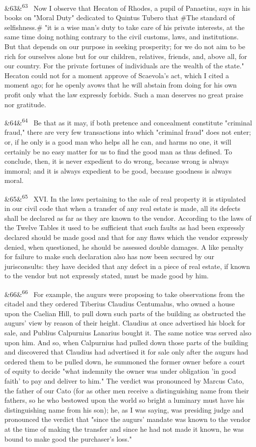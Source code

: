 \documentclass[12pt]{article}
\newcommand{\para}[1][]{\par\noindent\ifx&#1&\else\textsuperscript{\footnotesize #1}~\fi}
\begin{document}
\para[63] Now I observe that Hecaton of Rhodes, a pupil of Panaetius, says in his books on "Moral Duty" dedicated to Quintus Tubero that \#The standard of selfishness.\# "it is a wise man's duty to take care of his private interests, at the same time doing nothing contrary to the civil customs, laws, and institutions. But that depends on our purpose in seeking prosperity; for we do not aim to be rich for ourselves alone but for our children, relatives, friends, and, above all, for our country. For the private fortunes of individuals are the wealth of the state." Hecaton could not for a moment approve of Scaevola's act, which I cited a moment ago; for he openly avows that he will abstain from doing for his own profit only what the law expressly forbids. Such a man deserves no great praise nor gratitude.

\para[64] Be that as it may, if both pretence and concealment constitute "criminal fraud," there are very few transactions into which "criminal fraud" does not enter; or, if he only is a good man who helps all he can, and harms no one, it will certainly be no easy matter for us to find the good man as thus defined. To conclude, then, it is never expedient to do wrong, because wrong is always immoral; and it is always expedient to be good, because goodness is always moral.

\para[65] XVI. In the laws pertaining to the sale of real property it is stipulated in our civil code that when a transfer of any real estate is made, all its defects shall be declared as far as they are known to the vendor. According to the laws of the Twelve Tables it used to be sufficient that such faults as had been expressly declared should be made good and that for any flaws which the vendor expressly denied, when questioned, he should be assessed double damages. A like penalty for failure to make such declaration also has now been secured by our jurisconsults: they have decided that any defect in a piece of real estate, if known to the vendor but not expressly stated, must be made good by him.

\para[66] For example, the augurs were proposing to take observations from the citadel and they ordered Tiberius Claudius Centumalus, who owned a house upon the Caelian Hill, to pull down such parts of the building as obstructed the augurs' view by reason of their height. Claudius at once advertised his block for sale, and Publius Calpurnius Lanarius bought it. The same notice was served also upon him. And so, when Calpurnius had pulled down those parts of the building and discovered that Claudius had advertised it for sale only after the augurs had ordered them to be pulled down, he summoned the former owner before a court of equity to decide "what indemnity the owner was under obligation 'in good faith' to pay and deliver to him." The verdict was pronounced by Marcus Cato, the father of our Cato (for as other men receive a distinguishing name from their fathers, so he who bestowed upon the world so bright a luminary must have his distinguishing name from his son); he, as I was saying, was presiding judge and pronounced the verdict that "since the augurs' mandate was known to the vendor at the time of making the transfer and since he had not made it known, he was bound to make good the purchaser's loss."
\end{document}
